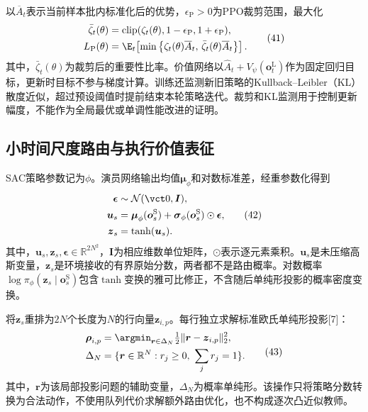 以$\overline A_t$表示当前样本批内标准化后的优势，$\epsilon_{\mathrm P}>0$为PPO裁剪范围，最大化
\[
\begin{aligned}
 \bar\zeta_t(\theta)&=\operatorname{clip}(\zeta_t(\theta),1-\epsilon_{\mathrm P},1+\epsilon_{\mathrm P}),\\
 L_{\mathrm P}(\theta)&=
 \E_t\!\left[\min\left\{\zeta_t(\theta)\overline A_t,\,
 \bar\zeta_t(\theta)\overline A_t\right\}\right].
 \end{aligned}\tag{41}
\]
其中，$\bar\zeta_t(\theta)$为裁剪后的重要性比率。价值网络以$\widehat A_t+V_\psi(\boldsymbol o_t^{\mathrm L})$作为固定回归目标，更新时目标不参与梯度计算。训练还监测新旧策略的Kullback--Leibler（KL）散度近似，超过预设阈值时提前结束本轮策略迭代。裁剪和KL监测用于控制更新幅度，不能作为全局最优或单调性能改进的证明。

\subsection{小时间尺度路由与执行价值表征}
SAC策略参数记为$\phi$。演员网络输出均值$\boldsymbol\mu_\phi$和对数标准差，经重参数化得到
\[
\begin{aligned}
 \boldsymbol \epsilon&\sim\mathcal N(\vct0,\boldsymbol I),\\
 \boldsymbol u_s&=\boldsymbol\mu_\phi(\boldsymbol o_s^{\mathrm S})
 +\boldsymbol\sigma_\phi(\boldsymbol o_s^{\mathrm S})\odot\boldsymbol\epsilon,\\
 \boldsymbol z_s&=\tanh(\boldsymbol u_s).
 \end{aligned}\tag{42}
\]
其中，$\boldsymbol u_s,\boldsymbol z_s,\boldsymbol\epsilon\in\mathbb{R}^{2N^2}$，$\boldsymbol I$为相应维数单位矩阵，$\odot$表示逐元素乘积。$\boldsymbol u_s$是未压缩高斯变量，$\boldsymbol z_s$是环境接收的有界原始分数，两者都不是路由概率。对数概率$\log\pi_\phi(\boldsymbol z_s\mid\boldsymbol o_s^{\mathrm S})$包含$\tanh$变换的雅可比修正，不含随后单纯形投影的概率密度变换。

将$\boldsymbol z_s$重排为$2N$个长度为$N$的行向量$\boldsymbol z_{i,p}$。每行独立求解标准欧氏单纯形投影[7]：
\[
\begin{aligned}
 \boldsymbol\rho_{i,p}&=
 \argmin_{\boldsymbol r\in\Delta_N}\tfrac12\|\boldsymbol r-\boldsymbol z_{i,p}\|_2^2,\\
 \Delta_N&=\{\boldsymbol r\in\mathbb{R}^N:r_j\ge0,\ \sum_jr_j=1\}.
 \end{aligned}\tag{43}
\]
其中，$\boldsymbol r$为该局部投影问题的辅助变量，$\Delta_N$为概率单纯形。该操作只将策略分数转换为合法动作，不使用队列代价求解额外路由优化，也不构成逐次凸近似教师。

